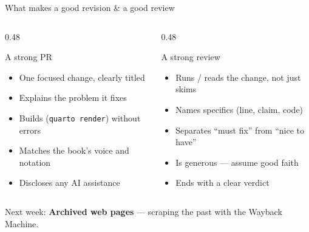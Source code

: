 \documentclass[9pt,aspectratio=169]{beamer}
\begin{document}
\begin{frame}{What makes a good revision \& a good review}
    \begin{columns}[T]
        \begin{column}{0.48\textwidth}
            \begin{block}{A strong PR}
                \begin{itemize}\small
                    \item One focused change, clearly titled
                    \item Explains the problem it fixes
                    \item Builds (\texttt{quarto render}) without errors
                    \item Matches the book's voice and notation
                    \item Discloses any AI assistance
                \end{itemize}
            \end{block}
        \end{column}
        \begin{column}{0.48\textwidth}
            \begin{block}{A strong review}
                \begin{itemize}\small
                    \item Runs / reads the change, not just skims
                    \item Names specifics (line, claim, code)
                    \item Separates ``must fix'' from ``nice to have''
                    \item Is generous --- assume good faith
                    \item Ends with a clear verdict
                \end{itemize}
            \end{block}
        \end{column}
    \end{columns}
    \vspace{0.5em}
    \centering\small Next week: \textbf{Archived web pages} --- scraping the past with the Wayback Machine.
\end{frame}
\end{document}
